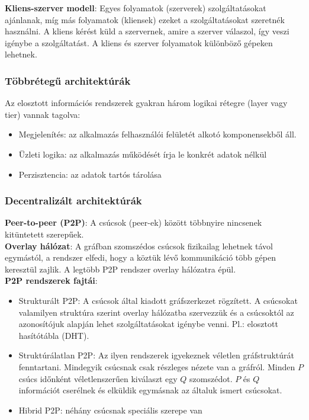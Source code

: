 \documentclass[margin=0px]{article}
\begin{document}
\noindent \textbf{Kliens-szerver modell}: Egyes folyamatok (szerverek) szolgáltatásokat ajánlanak, míg más folyamatok (kliensek)
ezeket a szolgáltatásokat szeretnék használni. A kliens kérést küld a szervernek, amire a szerver válaszol, így veszi igénybe
a szolgáltatást. A kliens és szerver folyamatok különböző gépeken lehetnek.

\subsubsection{Többrétegű architektúrák}

Az elosztott információs rendszerek gyakran három logikai rétegre (layer vagy tier) vannak tagolva:

\begin{itemize}
    \item	Megjelenítés: az alkalmazás felhasználói felületét alkotó komponensekből áll.
    \item	Üzleti logika: az alkalmazás működését írja le konkrét adatok nélkül
    \item	Perzisztencia: az adatok tartós tárolása
\end{itemize}

\subsubsection{Decentralizált architektúrák}

\noindent \textbf{Peer-to-peer (P2P)}: A csúcsok (peer-ek) között többnyire nincsenek kitüntetett szerepűek.\\

\noindent \textbf{Overlay hálózat}: A gráfban szomszédos csúcsok fizikailag lehetnek távol egymástól,
a rendszer elfedi, hogy a köztük lévő kommunikáció több gépen keresztül zajlik. A legtöbb P2P
rendszer overlay hálózatra épül.\\

\noindent \textbf{P2P rendszerek fajtái}:
\begin{itemize}
    \item	Strukturált P2P: A csúcsok által kiadott gráfszerkezet rögzített. A csúcsokat valamilyen struktúra
          szerint overlay hálózatba szervezzük és a csúcsoktól az azonosítójuk alapján lehet szolgáltatásokat
          igénybe venni. Pl.: elosztott hasítótábla (DHT).

    \item	Struktúrálatlan P2P:  Az ilyen rendszerek igyekeznek véletlen gráfstruktúrát fenntartani. Mindegyik
          csúcsnak csak részleges nézete van a gráfról. Minden $P$ csúcs időnként véletlenszerűen kiválaszt egy $Q$
          szomszédot. $P$ és $Q$ információt cserélnek és elküldik egymásnak az általuk ismert csúcsokat.

    \item	Hibrid P2P: néhány csúcsnak speciális szerepe van
\end{itemize}
\end{document}

